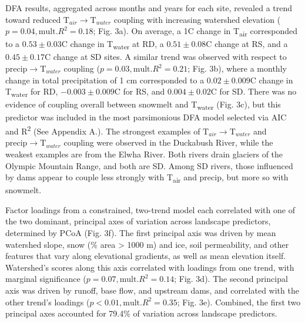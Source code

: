 \documentclass[notitlepage]{article}
\begin{document}
DFA results, aggregated across months and years for each site, revealed a trend toward reduced $\textrm{T}_{air}\rightarrow \textrm{T}_{water}$ coupling with increasing watershed elevation ($p=0.04, \textrm{mult.} R^2=0.18$; Fig. 3a). On average, a 1\degree C change in T\textsubscript{air} corresponded to a $0.53\pm 0.03$\degree C change in T\textsubscript{water} at RD, a $0.51\pm 0.08$\degree C change at RS, and a $0.45\pm 0.17$\degree C change at SD sites. A similar trend was observed with respect to $\textrm{precip}\rightarrow \textrm{T}_{water}$ coupling ($p=0.03, \textrm{mult.} R^2=0.21$; Fig. 3b), where a monthly change in total precipitation of 1 cm corresponded to a $0.02\pm 0.009$\degree C change in T\textsubscript{water} for RD, $-0.003\pm 0.009$\degree C for RS, and $0.004\pm 0.02$\degree C for SD. There was no evidence of coupling overall between snowmelt and T\textsubscript{water} (Fig. 3c), but this predictor was included in the most parsimonious DFA model selected via AIC and R\textsuperscript{2} (See Appendix A.). The strongest examples of $\textrm{T}_{air}\rightarrow \textrm{T}_{water}$ and $\textrm{precip}\rightarrow \textrm{T}_{water}$ coupling were observed in the Duckabush River, while the weakest examples are from the Elwha River. Both rivers drain glaciers of the Olympic Mountain Range, and both are SD. Among SD rivers, those influenced by dams appear to couple less strongly with T\textsubscript{air} and precip, but more so with snowmelt.

Factor loadings from a constrained, two-trend model each correlated with one of the two dominant, principal axes of variation across landscape predictors, determined by PCoA (Fig. 3f). The first principal axis was driven by mean watershed slope, snow (\% area > 1000 m) and ice, soil permeability, and other features that vary along elevational gradients, as well as mean elevation itself. Watershed's scores along this axis correlated with loadings from one trend, with marginal significance ($p=0.07, \textrm{mult.} R^2=0.14$; Fig. 3d). The second principal axis was driven by runoff, base flow, and upstream dams, and correlated with the other trend's loadings ($p<0.01, \textrm{mult.} R^2=0.35$; Fig. 3e). Combined, the first two principal axes accounted for 79.4\% of variation across landscape predictors.
\end{document}
